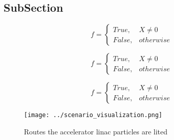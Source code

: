 \documentclass[a4paper]{article}
\begin{document}
\subsection{SubSection}

\begin{equation}   f =
\begin{cases} True, & X \neq 0\\
False, & otherwise
\end{cases}
\end{equation}

\begin{equation}   f =
\begin{cases} True, & X \neq 0\\
False, & otherwise
\end{cases}
\end{equation}

\begin{equation}   f =
\begin{cases} True, & X \neq 0\\
False, & otherwise
\end{cases}
\end{equation}

\begin{figure}
\centering
\texttt{[image: ../scenario\_visualization.png]}
\caption{Routes the accelerator linac particles are lited 
}
\end{figure}
 
\end{document}
